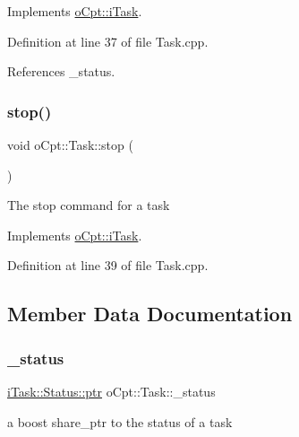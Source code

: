 Implements \hyperlink{classo_cpt_1_1i_task_a8d6126b2e337a0ab39fdef1d8d7b73b9}{o\+Cpt\+::i\+Task}.



Definition at line 37 of file Task.\+cpp.



References \+\_\+status.

\hypertarget{classo_cpt_1_1_task_a62b4f1bbc1cf24434d2a2130162507f7}{}\label{classo_cpt_1_1_task_a62b4f1bbc1cf24434d2a2130162507f7} 
\subsubsection{\texorpdfstring{stop()}{stop()}}
{\footnotesize\ttfamily void o\+Cpt\+::\+Task\+::stop (\begin{DoxyParamCaption}{ }\end{DoxyParamCaption})\hspace{0.3cm}{\ttfamily [virtual]}}

The stop command for a task 

Implements \hyperlink{classo_cpt_1_1i_task_aedb88813b16914598dee9561813e56e8}{o\+Cpt\+::i\+Task}.



Definition at line 39 of file Task.\+cpp.



\subsection{Member Data Documentation}
\hypertarget{classo_cpt_1_1_task_a51a0e1718a13e6d59af76511e6473743}{}\label{classo_cpt_1_1_task_a51a0e1718a13e6d59af76511e6473743} 
\subsubsection{\texorpdfstring{\+\_\+status}{\_status}}
{\footnotesize\ttfamily \hyperlink{classo_cpt_1_1i_task_1_1_status_aaf766c58d038e2defc3de2dddb92d1eb}{i\+Task\+::\+Status\+::ptr} o\+Cpt\+::\+Task\+::\+\_\+status\hspace{0.3cm}{\ttfamily [protected]}}



a boost share\+\_\+ptr to the status of a task 




